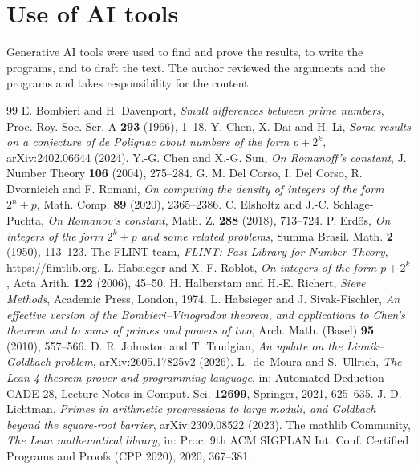 \documentclass[11pt]{amsart}
\theoremstyle{definition}
\theoremstyle{remark}
\numberwithin{equation}{section}
\begin{document}
\section*{Use of AI tools}
Generative AI tools were used to find and prove the results, to write the programs, and to draft the text. The author reviewed the arguments and the programs and takes responsibility for the content.

\begin{thebibliography}{99}
 E. Bombieri and H. Davenport, \emph{Small differences between prime numbers}, Proc. Roy. Soc. Ser. A \textbf{293} (1966), 1--18.
 Y. Chen, X. Dai and H. Li, \emph{Some results on a conjecture of de Polignac about numbers of the form $p+2^k$}, arXiv:2402.06644 (2024).
 Y.-G. Chen and X.-G. Sun, \emph{On Romanoff's constant}, J. Number Theory \textbf{106} (2004), 275--284.
 G. M. Del Corso, I. Del Corso, R. Dvornicich and F. Romani, \emph{On computing the density of integers of the form $2^n+p$}, Math. Comp. \textbf{89} (2020), 2365--2386.
 C. Elsholtz and J.-C. Schlage-Puchta, \emph{On Romanov's constant}, Math. Z. \textbf{288} (2018), 713--724.
 P. Erd\H{o}s, \emph{On integers of the form $2^k+p$ and some related problems}, Summa Brasil. Math. \textbf{2} (1950), 113--123.
 The FLINT team, \emph{FLINT: Fast Library for Number Theory}, \url{https://flintlib.org}.
 L. Habsieger and X.-F. Roblot, \emph{On integers of the form $p+2^k$}, Acta Arith. \textbf{122} (2006), 45--50.
 H. Halberstam and H.-E. Richert, \emph{Sieve Methods}, Academic Press, London, 1974.
 L. Habsieger and J. Sivak-Fischler, \emph{An effective version of the Bombieri--Vinogradov theorem, and applications to Chen's theorem and to sums of primes and powers of two}, Arch. Math. (Basel) \textbf{95} (2010), 557--566.
 D. R. Johnston and T. Trudgian, \emph{An update on the Linnik--Goldbach problem}, arXiv:2605.17825v2 (2026).
 L.~de~Moura and S.~Ullrich, \emph{The Lean 4 theorem prover and programming language}, in: Automated Deduction -- CADE 28, Lecture Notes in Comput. Sci. \textbf{12699}, Springer, 2021, 625--635.
 J. D. Lichtman, \emph{Primes in arithmetic progressions to large moduli, and Goldbach beyond the square-root barrier}, arXiv:2309.08522 (2023).
 The mathlib Community, \emph{The Lean mathematical library}, in: Proc. 9th ACM SIGPLAN Int. Conf. Certified Programs and Proofs (CPP 2020), 2020, 367--381.

\end{thebibliography}
\end{document}
